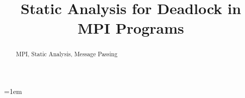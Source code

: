 \documentclass[preprint]{sigplanconf}
\begin{document}
\setlength{\pdfpageheight}{\paperheight}
\setlength{\pdfpagewidth}{\paperwidth}


\title{Static Analysis for Deadlock in MPI Programs}
\authorinfo{}


\maketitle
%
%
\emergencystretch=1em


\begin{abstract}


\keywords
MPI, Static Analysis, Message Passing

\end{abstract}










%




\newpage


\end{document}
